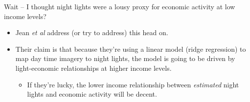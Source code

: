 \documentclass[mathserif, aspectratio=169]{beamer}
\begin{document}
\begin{frame}{Wait -- I thought night lights were a lousy proxy for economic activity at low income levels?}

\begin{itemize}
\item Jean \textit{et al} address (or try to address) this head on.  
\item Their claim is that because they're using a linear model (ridge regression) to map day time imagery to  night lights, the model is going to be driven by light-economic relationships at higher income levels.  
\begin{itemize}
 \item If they're lucky, the lower income relationship between \textit{estimated} night lights and economic activity will be decent.
 \end{itemize} 
\end{itemize}
\end{frame}
\end{document}
